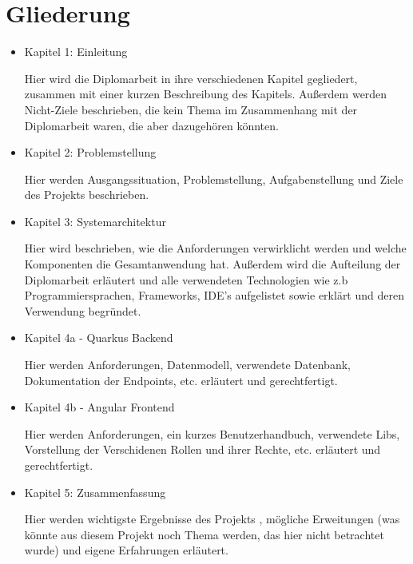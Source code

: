 
\section{Gliederung}

\begin{itemize}
    \item  Kapitel 1: Einleitung
    
    Hier wird die Diplomarbeit in ihre verschiedenen Kapitel gegliedert, zusammen mit einer kurzen 		Beschreibung des Kapitels. Außerdem werden Nicht-Ziele beschrieben, die kein Thema im 	Zusammenhang mit der Diplomarbeit waren, die aber dazugehören könnten.
    
    \item  Kapitel 2: Problemstellung
    
    Hier werden Ausgangssituation, Problemstellung, Aufgabenstellung und Ziele des Projekts beschrieben.
    
    \item  Kapitel 3: Systemarchitektur
    
    Hier wird beschrieben, wie die Anforderungen verwirklicht werden und welche Komponenten die Gesamtanwendung hat. Außerdem wird die Aufteilung der Diplomarbeit erläutert und alle verwendeten Technologien wie z.b Programmiersprachen, Frameworks, IDE's aufgelistet sowie erklärt und deren Verwendung begründet.
    
    \item  Kapitel 4a - Quarkus Backend
    
    Hier werden Anforderungen, Datenmodell, verwendete Datenbank, Dokumentation der Endpoints, etc. erläutert und gerechtfertigt.
    
    \item  Kapitel 4b - Angular Frontend
    
    Hier werden Anforderungen, ein kurzes Benutzerhandbuch, verwendete Libs, Vorstellung der Verschidenen Rollen und ihrer Rechte, etc. erläutert und gerechtfertigt.
    
    \item  Kapitel 5: Zusammenfassung
    
    Hier werden wichtigste Ergebnisse des Projekts , mögliche Erweitungen (was könnte aus diesem Projekt noch Thema werden, das hier nicht betrachtet wurde) und eigene Erfahrungen erläutert.
\end{itemize}